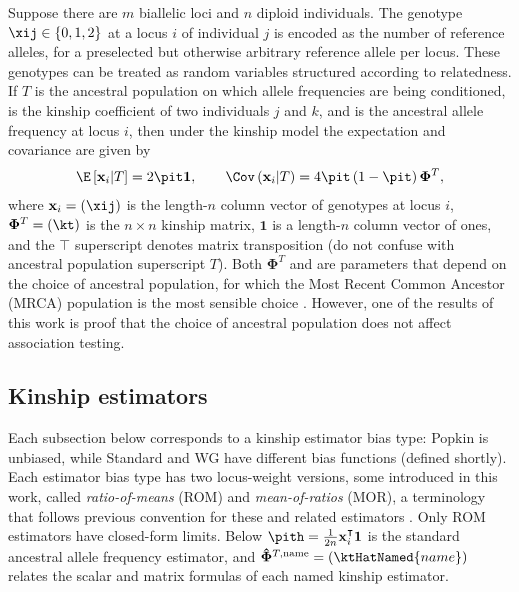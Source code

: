 \documentclass[11pt]{article}
\newcommand{\kinMat}[1][T]{%
  \ensuremath{%
    \mathbf{\Phi}^{#1}
  }%
  \xspace%
}%
\newcommand{\kinMatEstNamed}[1]{%
  \ensuremath{%
    \mathbf{\hat{\Phi}}^{T,\text{#1}}
  }%
  \xspace%
}%
\begin{document}
Suppose there are $m$ biallelic loci and $n$ diploid individuals.
The genotype $\xij \in \{0,1,2\}$ at a locus $i$ of individual $j$ is encoded as the number of reference alleles, for a preselected but otherwise arbitrary reference allele per locus.
These genotypes can be treated as random variables structured according to relatedness.
If $T$ is the ancestral population on which allele frequencies are being conditioned, \kt is the kinship coefficient of two individuals $j$ and $k$, and \pit is the ancestral allele frequency at locus $i$, then under the kinship model \citep{ochoa_estimating_2021} the expectation and covariance are given by
\begin{align*}
  \E \left[ \mathbf{x}_i \middle| T \right]
  =
    2 \pit \mathbf{1}
  ,
  \quad\quad
  \Cov \left(\mathbf{x}_i \middle| T \right)
  =
    4 \pit \left( 1 - \pit \right) \kinMat
    ,
\end{align*}
where $\mathbf{x}_i = (\xij)$ is the length-$n$ column vector of genotypes at locus $i$, $\kinMat = (\kt)$ is the $n \times n$ kinship matrix, $\mathbf{1}$ is a length-$n$ column vector of ones, and the $\intercal$ superscript denotes matrix transposition (do not confuse with ancestral population superscript $T$).
Both \kinMat and \pit are parameters that depend on the choice of ancestral population, for which the Most Recent Common Ancestor (MRCA) population is the most sensible choice \citep{ochoa_estimating_2021}.
However, one of the results of this work is proof that the choice of ancestral population does not affect association testing.

\subsection{Kinship estimators}

Each subsection below corresponds to a kinship estimator bias type: Popkin is unbiased, while Standard and WG have different bias functions (defined shortly).
Each estimator bias type has two locus-weight versions, some introduced in this work, called \textit{ratio-of-means} (ROM) and \textit{mean-of-ratios} (MOR), a terminology that follows previous convention for these and related estimators \citep{bhatia_estimating_2013, ochoa_estimating_2021}.
Only ROM estimators have closed-form limits.
Below
$
\pith
=
\frac{1}{2n} \mathbf{x}_i^\intercal \mathbf{1}
$
is the standard ancestral allele frequency estimator,
and
$\kinMatEstNamed{name} = (\ktHatNamed{name})$
relates the scalar and matrix formulas of each named kinship estimator.
\end{document}
